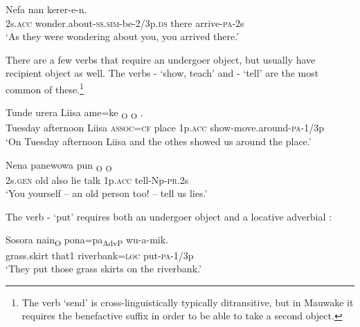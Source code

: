 \ea%
\label{ex:3:x303}
\gll Nefa  nan kerer-e-n. \\
2s.\textsc{acc} wonder.about-\textsc{ss}.\textsc{sim}-be-2/3p.\textsc{ds} there arrive-\textsc{pa}-2s\\
\glt`As they were wondering about you, you arrived there.'
\z

There are a few verbs that require an undergoer object, but usually have recipient object as well. The verbs - `show, teach'  and - `tell'  are the most common of these.\footnote{The verb `send' is cross-linguistically typically ditransitive, but in Mauwake it requires the benefactive suffix in order to be able to take a second object.} 

\ea%
\label{ex:3:x1838}
\gll Tunde urera Liisa ame=ke {\ob}\textsubscript{O} {\ob}\textsubscript{O} \textstyleEmphasizedVernacularWords{-}\textstyleEmphasizedVernacularWords{-}.\\
Tuesday afternoon Liisa \textsc{assoc}=\textsc{cf} place 1p.\textsc{acc} show-move.around-\textsc{pa}-1/3p\\
\glt`On Tuesday afternoon Liisa and the othes showed us around the place.'
\z

\ea%
\label{ex:3:x943}
\gll Nena panewowa pun {\ob} \textsubscript{O}  {\ob}\textsubscript{O}  \\
2s.\textsc{gen} old also lie talk 1p.\textsc{acc} tell-Np-\textsc{pr}.2s\\
\glt`You yourself -- an old person too! -- tell us lies.'
\z

The verb - `put' requires both an undergoer object and a locative adverbial : 

\ea%
\label{ex:3:x1837}
\gll {\ob}Sosora nain{\cb}\textsubscript{O} {\ob}pona=pa{\cb}\textsubscript{AdvP} wu-a-mik. \\
grass.skirt that1 riverbank=\textsc{loc} put-\textsc{pa}-1/3p\\
\glt`They put those grass skirts on the riverbank.'
\z

